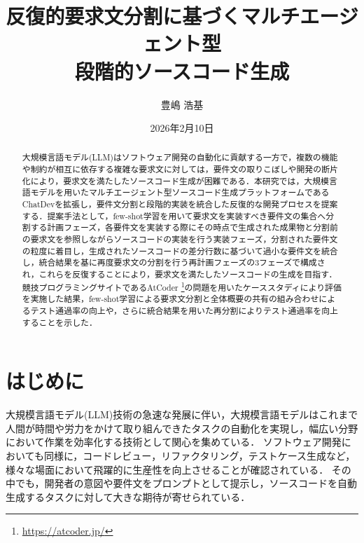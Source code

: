 \documentclass[11pt]{jreport}
\title{反復的要求文分割に基づくマルチエージェント型\\段階的ソースコード生成}
\author{豊嶋 浩基}
\date{2026年2月10日}	%
\begin{document}
\maketitle

\begin{abstract}
大規模言語モデル(LLM)はソフトウェア開発の自動化に貢献する一方で，複数の機能や制約が相互に依存する複雑な要求文に対しては，要件文の取りこぼしや開発の断片化により，要求文を満たしたソースコード生成が困難である．本研究では，大規模言語モデルを用いたマルチエージェント型ソースコード生成プラットフォームであるChatDevを拡張し，要件文分割と段階的実装を統合した反復的な開発プロセスを提案する．提案手法として，few-shot学習を用いて要求文を実装すべき要件文の集合へ分割する計画フェーズ，各要件文を実装する際にその時点で生成された成果物と分割前の要求文を参照しながらソースコードの実装を行う実装フェーズ，分割された要件文の粒度に着目し，生成されたソースコードの差分行数に基づいて過小な要件文を統合し，統合結果を基に再度要求文の分割を行う再計画フェーズの3フェーズで構成され，これらを反復することにより，要求文を満たしたソースコードの生成を目指す．競技プログラミングサイトであるAtCoder \footnote{\url{https://atcoder.jp/}}の問題を用いたケーススタディにより評価を実施した結果，few-shot学習による要求文分割と全体概要の共有の組み合わせによるテスト通過率の向上や，さらに統合結果を用いた再分割によりテスト通過率を向上することを示した．

\end{abstract}

\tableofcontents



\newpage
{}	%



\chapter{はじめに}

大規模言語モデル(LLM)技術の急速な発展に伴い，大規模言語モデルはこれまで人間が時間や労力をかけて取り組んできたタスクの自動化を実現し，幅広い分野において作業を効率化する技術として関心を集めている\cite{LLM_Development}．
ソフトウェア開発においても同様に，コードレビュー，リファクタリング，テストケース生成など，様々な場面において飛躍的に生産性を向上させることが確認されている\cite{Use_LLM_1, Use_LLM_2, Use_LLM_3}．
その中でも，開発者の意図や要件文をプロンプトとして提示し，ソースコードを自動生成するタスクに対して大きな期待が寄せられている\cite{LLM_Code_Generation}．
\end{document}
